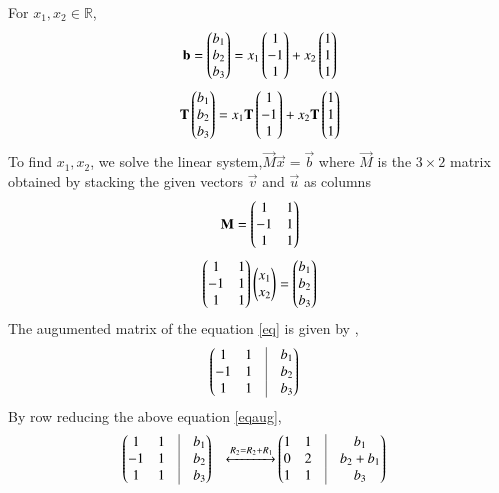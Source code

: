 \documentclass[journal,12pt,twocolumn]{IEEEtran}
\begin{document}
For $x_1,x_2 \in \mathbb{R}$,
\begin{align}
    \mathbf{b}=\begin{pmatrix}b_1\\b_2\\b_3\end{pmatrix}=x_1\begin{pmatrix}1\\-1\\1\end{pmatrix}+x_2\begin{pmatrix}1\\1\\1\end{pmatrix}
\end{align}
\begin{align}
    \mathbf{T}\begin{pmatrix}b_1\\b_2\\b_3\end{pmatrix}=x_1\mathbf{T}\begin{pmatrix}1\\-1\\1\end{pmatrix}+x_2\mathbf{T}\begin{pmatrix}1\\1\\1\end{pmatrix}\label{eq1}
\end{align}
To find $x_1,x_2$, we solve the linear system,$\vec{M}\vec{x}=\vec{b}$ where $\vec{M}$ is the $3 \times 2$ matrix obtained by stacking the given vectors $\vec{v}$ and $\vec{u}$ as columns
\begin{align}
    \mathbf{M}=\begin{pmatrix}1 & 1\\-1 & 1 \\ 1 & 1\end{pmatrix}
\end{align}
\begin{align}
\begin{pmatrix}1 & 1\\-1 & 1 \\ 1 & 1\end{pmatrix}\begin{pmatrix}x_1\\x_2\end{pmatrix}=\begin{pmatrix}b_1\\b_2\\b_3\end{pmatrix}\label{eq}
\end{align}
The augumented matrix of the equation \eqref{eq} is given by ,
\begin{align}
    &\myvec{1& 1 &\vrule & b_1 \\ -1 & 1 & \vrule& b_2\\ 1 & 1 &\vrule & b_3}\label{eqaug}
\end{align}
By row reducing the above equation \eqref{eqaug},
\begin{align}
    &\myvec{1& 1 &\vrule & b_1 \\ -1 & 1 & \vrule& b_2\\ 1 & 1 &\vrule & b_3}&\xleftrightarrow{R_2=R_2+R_1}&\myvec{1& 1 &\vrule & b_1 \\ 0 & 2 & \vrule& b_2+b_1\\ 1 & 1 &\vrule & b_3}
\end{align}
\end{document}

